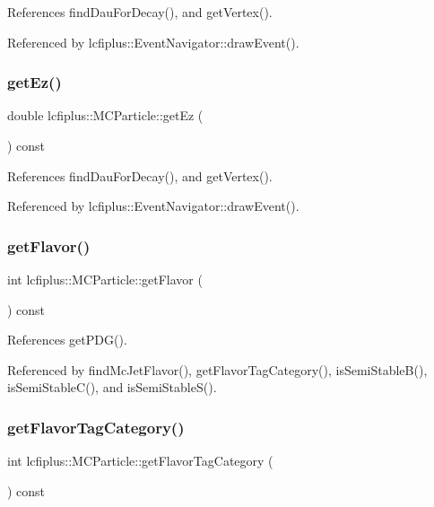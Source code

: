 References find\+Dau\+For\+Decay(), and get\+Vertex().



Referenced by lcfiplus\+::\+Event\+Navigator\+::draw\+Event().

\mbox{\label{classlcfiplus_1_1MCParticle_a2653a1e92d8e34393555fab8f0043135}} 
\subsubsection{get\+Ez()}
{\footnotesize\ttfamily double lcfiplus\+::\+M\+C\+Particle\+::get\+Ez (\begin{DoxyParamCaption}{ }\end{DoxyParamCaption}) const}



References find\+Dau\+For\+Decay(), and get\+Vertex().



Referenced by lcfiplus\+::\+Event\+Navigator\+::draw\+Event().

\mbox{\label{classlcfiplus_1_1MCParticle_adeeac79a9f7f90be113d32f37025d54a}} 
\subsubsection{get\+Flavor()}
{\footnotesize\ttfamily int lcfiplus\+::\+M\+C\+Particle\+::get\+Flavor (\begin{DoxyParamCaption}{ }\end{DoxyParamCaption}) const}



References get\+P\+D\+G().



Referenced by find\+Mc\+Jet\+Flavor(), get\+Flavor\+Tag\+Category(), is\+Semi\+Stable\+B(), is\+Semi\+Stable\+C(), and is\+Semi\+Stable\+S().

\mbox{\label{classlcfiplus_1_1MCParticle_ab5ef0022ba168a02c6d9313a958e75f8}} 
\subsubsection{get\+Flavor\+Tag\+Category()}
{\footnotesize\ttfamily int lcfiplus\+::\+M\+C\+Particle\+::get\+Flavor\+Tag\+Category (\begin{DoxyParamCaption}{ }\end{DoxyParamCaption}) const}



